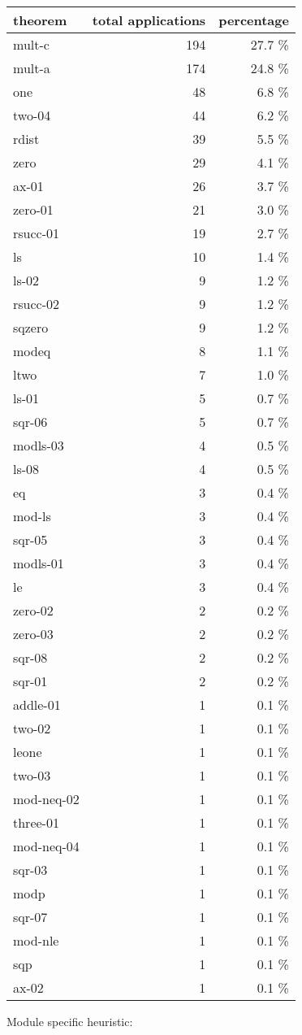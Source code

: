 \documentclass[a4paper]{article}
\begin{document}
\begin{supertabular}{l|r|r}
theorem	        & total applications & percentage \\ \hline
mult-c & 194 & 27.7 \% \\
mult-a & 174 & 24.8 \% \\
one & 48 & 6.8 \% \\
two-04 & 44 & 6.2 \% \\
rdist & 39 & 5.5 \% \\
zero & 29 & 4.1 \% \\
ax-01 & 26 & 3.7 \% \\
zero-01 & 21 & 3.0 \% \\
rsucc-01 & 19 & 2.7 \% \\
ls & 10 & 1.4 \% \\
ls-02 & 9 & 1.2 \% \\
rsucc-02 & 9 & 1.2 \% \\
sqzero & 9 & 1.2 \% \\
modeq & 8 & 1.1 \% \\
ltwo & 7 & 1.0 \% \\
ls-01 & 5 & 0.7 \% \\
sqr-06 & 5 & 0.7 \% \\
modls-03 & 4 & 0.5 \% \\
ls-08 & 4 & 0.5 \% \\
eq & 3 & 0.4 \% \\
mod-ls & 3 & 0.4 \% \\
sqr-05 & 3 & 0.4 \% \\
modls-01 & 3 & 0.4 \% \\
le & 3 & 0.4 \% \\
zero-02 & 2 & 0.2 \% \\
zero-03 & 2 & 0.2 \% \\
sqr-08 & 2 & 0.2 \% \\
sqr-01 & 2 & 0.2 \% \\
addle-01 & 1 & 0.1 \% \\
two-02 & 1 & 0.1 \% \\
leone & 1 & 0.1 \% \\
two-03 & 1 & 0.1 \% \\
mod-neq-02 & 1 & 0.1 \% \\
three-01 & 1 & 0.1 \% \\
mod-neq-04 & 1 & 0.1 \% \\
sqr-03 & 1 & 0.1 \% \\
modp & 1 & 0.1 \% \\
sqr-07 & 1 & 0.1 \% \\
mod-nle & 1 & 0.1 \% \\
sqp & 1 & 0.1 \% \\
ax-02 & 1 & 0.1 \% \\

\end{supertabular}

Module specific heuristic:
\end{document}
